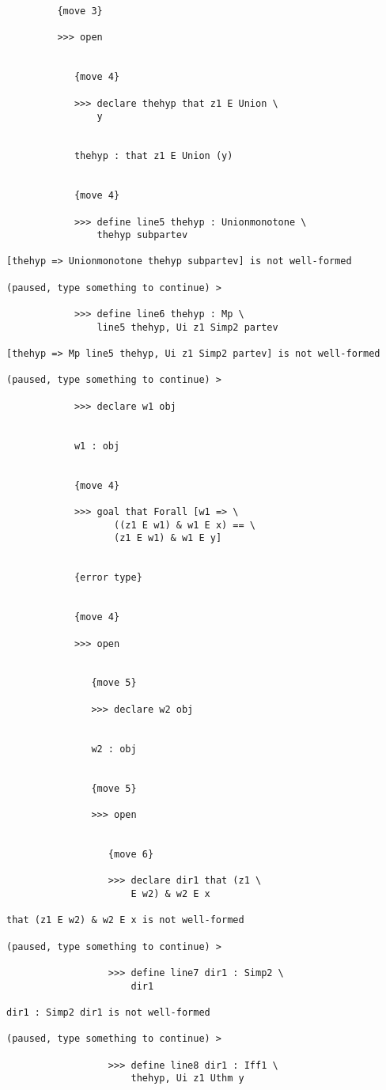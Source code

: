 \documentclass[12pt]{article}
\begin{document}
\begin{verbatim}
         {move 3}

         >>> open


            {move 4}

            >>> declare thehyp that z1 E Union \
                y


            thehyp : that z1 E Union (y)


            {move 4}

            >>> define line5 thehyp : Unionmonotone \
                thehyp subpartev

[thehyp => Unionmonotone thehyp subpartev] is not well-formed

(paused, type something to continue) >

            >>> define line6 thehyp : Mp \
                line5 thehyp, Ui z1 Simp2 partev

[thehyp => Mp line5 thehyp, Ui z1 Simp2 partev] is not well-formed

(paused, type something to continue) >

            >>> declare w1 obj


            w1 : obj


            {move 4}

            >>> goal that Forall [w1 => \
                   ((z1 E w1) & w1 E x) == \
                   (z1 E w1) & w1 E y]


            {error type}


            {move 4}

            >>> open


               {move 5}

               >>> declare w2 obj


               w2 : obj


               {move 5}

               >>> open


                  {move 6}

                  >>> declare dir1 that (z1 \
                      E w2) & w2 E x

that (z1 E w2) & w2 E x is not well-formed

(paused, type something to continue) >

                  >>> define line7 dir1 : Simp2 \
                      dir1

dir1 : Simp2 dir1 is not well-formed

(paused, type something to continue) >

                  >>> define line8 dir1 : Iff1 \
                      thehyp, Ui z1 Uthm y


\end{verbatim}
\end{document}
